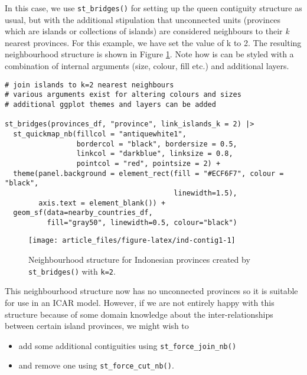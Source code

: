 In this case, we use \texttt{st\_bridges()} for setting up the queen contiguity
structure as usual, but with the additional stipulation that unconnected
units (provinces which are islands or collections of islands) are
considered neighbours to their \emph{k} nearest provinces. For this example,
we have set the value of k to 2. The resulting neighbourhood structure
is shown in Figure \ref{fig:ind-contig1}. Note how is can be styled with a combination of internal arguments (size, colour, fill etc.) and additional  layers.



\begin{verbatim}
# join islands to k=2 nearest neighbours
# various arguments exist for altering colours and sizes
# additional ggplot themes and layers can be added

st_bridges(provinces_df, "province", link_islands_k = 2) |> 
  st_quickmap_nb(fillcol = "antiquewhite1", 
                 bordercol = "black", bordersize = 0.5, 
                 linkcol = "darkblue", linksize = 0.8, 
                 pointcol = "red", pointsize = 2) + 
  theme(panel.background = element_rect(fill = "#ECF6F7", colour = "black", 
                                        linewidth=1.5),
        axis.text = element_blank()) +
  geom_sf(data=nearby_countries_df, 
          fill="gray50", linewidth=0.5, colour="black")
\end{verbatim}

\begin{figure}

{\centering \texttt{[image: article\_files/figure-latex/ind-contig1-1]} 

}

\caption{Neighbourhood structure for Indonesian provinces created by \texttt{st\_bridges()} with \texttt{k=2}.}\label{fig:ind-contig1}
\end{figure}

This neighbourhood structure now has no unconnected provinces so it is
suitable for use in an ICAR model. However, if we are not entirely happy with this structure because of some domain knowledge about the inter-relationships between certain island provinces, we might wish to

\begin{itemize}
\item
  add some additional contiguities using \texttt{st\_force\_join\_nb()}
\item
  and remove one using \texttt{st\_force\_cut\_nb()}.
\end{itemize}

